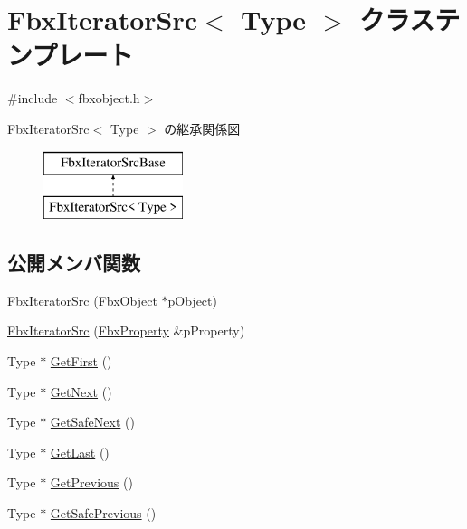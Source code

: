 \hypertarget{class_fbx_iterator_src}{}\section{Fbx\+Iterator\+Src$<$ Type $>$ クラステンプレート}
\label{class_fbx_iterator_src}


{\ttfamily \#include $<$fbxobject.\+h$>$}

Fbx\+Iterator\+Src$<$ Type $>$ の継承関係図\begin{figure}[H]
\begin{center}
\leavevmode
\includegraphics[height=2.000000cm]{class_fbx_iterator_src}
\end{center}
\end{figure}
\subsection*{公開メンバ関数}
\begin{DoxyCompactItemize}
\item 
\hyperlink{class_fbx_iterator_src_ad3a24f4ca3fe6adc2178e694e0ecd316}{Fbx\+Iterator\+Src} (\hyperlink{class_fbx_object}{Fbx\+Object} $\ast$p\+Object)
\item 
\hyperlink{class_fbx_iterator_src_a5982990c1de3efa6145b49ffcf129d39}{Fbx\+Iterator\+Src} (\hyperlink{class_fbx_property}{Fbx\+Property} \&p\+Property)
\item 
Type $\ast$ \hyperlink{class_fbx_iterator_src_aef5d6205bcb4f41501f5a1ec1765182c}{Get\+First} ()
\item 
Type $\ast$ \hyperlink{class_fbx_iterator_src_a04efb028369a31d5a822c3b2a7e23b16}{Get\+Next} ()
\item 
Type $\ast$ \hyperlink{class_fbx_iterator_src_a530db83b2a4c20190bcdc7b7a9af2811}{Get\+Safe\+Next} ()
\item 
Type $\ast$ \hyperlink{class_fbx_iterator_src_a44c9746ef3d04a0993781dfea8ac7142}{Get\+Last} ()
\item 
Type $\ast$ \hyperlink{class_fbx_iterator_src_a8b7703e63be49c3210f5a71946437027}{Get\+Previous} ()
\item 
Type $\ast$ \hyperlink{class_fbx_iterator_src_adc197165ab59e507a6aa84283c0a821b}{Get\+Safe\+Previous} ()
\end{DoxyCompactItemize}
